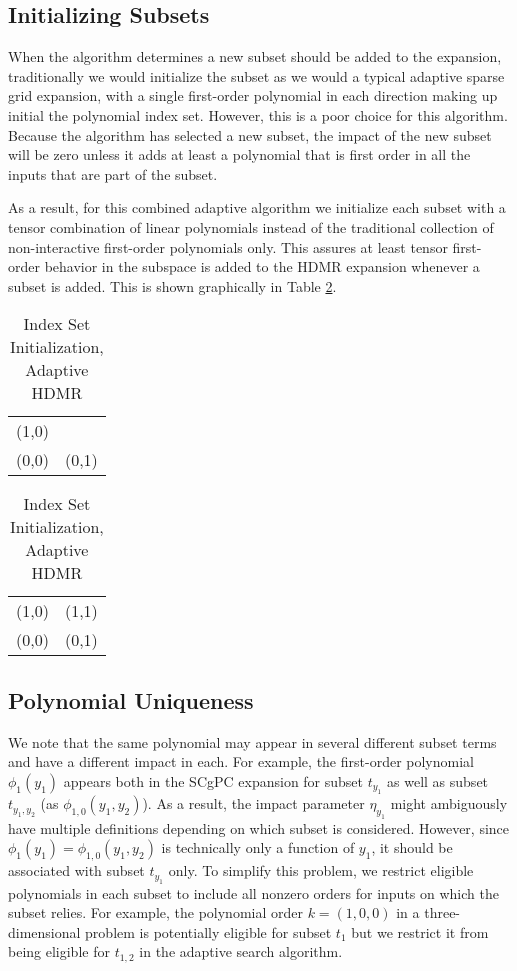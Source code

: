 \subsection{Initializing Subsets}
When the algorithm determines a new subset should be added to the expansion, traditionally we would initialize
the subset as we would a typical adaptive sparse grid expansion, with a single first-order polynomial in each
direction making up initial the polynomial index set.  However, this is a poor choice for this algorithm.  Because the
algorithm has selected a new subset, the impact of the new subset will be zero unless it adds at least a
polynomial that is first order in all the inputs that are part of the subset.

As a result, for this combined
adaptive algorithm we initialize each subset with a tensor combination of linear polynomials instead of the
traditional collection of non-interactive first-order polynomials only.  This assures at least tensor first-order
behavior in the subspace is added to the HDMR expansion whenever a subset is added.  This is shown graphically
in Table \ref{tab:iset ahdmr}.
\begin{table}
  \parbox{.45\linewidth}{
    \centering
    \begin{tabular}{c c}
      (1,0) &       \\
      (0,0) & (0,1)
    \end{tabular}
    \caption{Standard SCgPC Initialization}
  }
  \hfill
  \parbox{.45\linewidth}{
    \centering
    \begin{tabular}{c c}
      (1,0) & (1,1) \\
      (0,0) & (0,1)
    \end{tabular}
    \caption{SCgPC Initialization for Adaptive HDMR}
  }
  \caption{Index Set Initialization, Adaptive HDMR}
  \label{tab:iset ahdmr}
\end{table}

\subsection{Polynomial Uniqueness}\label{sec: one poly per subset}
We note that the same polynomial may appear in several different subset terms and have a
different impact in each.  For example, the first-order polynomial $\phi_1(y_1)$ appears both in the SCgPC
expansion for subset $t_{y_1}$ as well as subset $t_{y_1,y_2}$ (as $\phi_{1,0}(y_1,y_2)$).  As a result, 
the impact parameter $\eta_{y_1}$
might ambiguously have multiple definitions depending on which subset is considered.  However, since
$\phi_1(y_1) = \phi_{1,0}(y_1,y_2)$ is technically only a function of $y_1$, it should be associated with
subset $t_{y_1}$ only.
To simplify this problem, we restrict eligible polynomials in each subset to
include all nonzero orders for inputs on which the subset relies.  For example, the polynomial order $k=(1,0,0)$ in
a three-dimensional problem is potentially eligible for subset $t_1$ but we restrict it from being eligible for
$t_{1,2}$ in the adaptive search algorithm.

